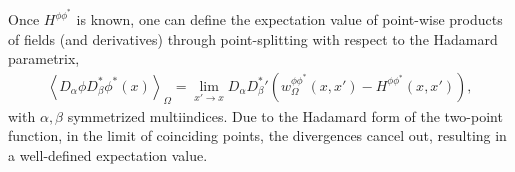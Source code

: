 Once $H^{\phi \phi^*}$ is known, one can define the expectation value of point-wise products of fields (and derivatives) through point-splitting with respect to the Hadamard parametrix, 
\begin{align}
	\left<D_\alpha \phi D^*_\beta \phi^*(x) \right>_\Omega = \lim_{x' \to x} D_\alpha D_\beta^* ' \left( w^{\phi\phi^*}_\Omega(x, x') - H^{\phi \phi^*}(x, x') \right),
	\label{eq:point-splitting-wrt-a-Hadamard-parametrix}
\end{align}
with $\alpha, \beta$ symmetrized multiindices.
Due to the Hadamard form of the two-point function, in the limit of coinciding points, the divergences cancel out, resulting in a well-defined expectation value.